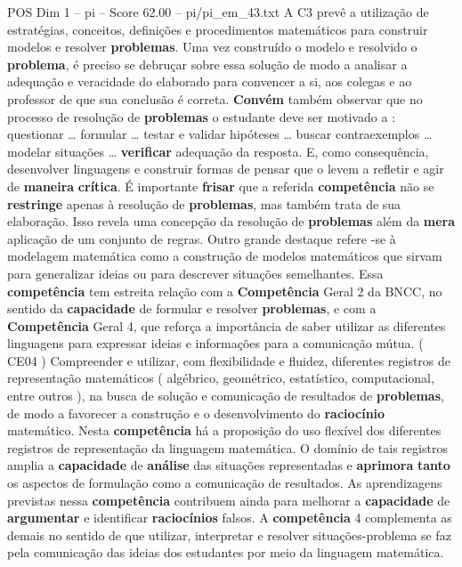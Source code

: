 \begin{textsample}{POS Dim 1 – pi – Score 62.00 – pi/pi\_em\_43.txt}
A C3 prevê a utilização de estratégias, conceitos, definições e procedimentos matemáticos para construir modelos e resolver \textbf{problemas}.
Uma vez construído o modelo e resolvido o \textbf{problema}, é preciso se debruçar sobre essa solução de modo a analisar a adequação e veracidade do elaborado para convencer a si, aos colegas e ao professor de que sua conclusão é correta. \textbf{Convém} também observar que no processo de resolução de \textbf{problemas} o estudante deve ser motivado a : questionar … formular … testar e validar hipóteses … buscar contraexemplos … modelar situações … \textbf{verificar} adequação da resposta.
E, como consequência, desenvolver linguagens e construir formas de pensar que o levem a refletir e agir de \textbf{maneira} \textbf{crítica}.
É importante \textbf{frisar} que a referida \textbf{competência} não se \textbf{restringe} apenas à resolução de \textbf{problemas}, mas também trata de sua elaboração.
Isso revela uma concepção da resolução de \textbf{problemas} além da \textbf{mera} aplicação de um conjunto de regras.
Outro grande destaque refere -se à modelagem matemática como a construção de modelos matemáticos que sirvam para generalizar ideias ou para descrever situações semelhantes.
Essa \textbf{competência} tem estreita relação com a \textbf{Competência} Geral 2 da BNCC, no sentido da \textbf{capacidade} de formular e resolver \textbf{problemas}, e com a \textbf{Competência} Geral 4, que reforça a importância de saber utilizar as diferentes linguagens para expressar ideias e informações para a comunicação mútua. ( CE04 ) Compreender e utilizar, com flexibilidade e fluidez, diferentes registros de representação matemáticos ( algébrico, geométrico, estatístico, computacional, entre outros ), na busca de solução e comunicação de resultados de \textbf{problemas}, de modo a favorecer a construção e o desenvolvimento do \textbf{raciocínio} matemático.
Nesta \textbf{competência} há a proposição do uso flexível dos diferentes registros de representação da linguagem matemática.
O domínio de tais registros amplia a \textbf{capacidade} de \textbf{análise} das situações representadas e \textbf{aprimora} \textbf{tanto} os aspectos de formulação como a comunicação de resultados.
As aprendizagens previstas nessa \textbf{competência} contribuem ainda para melhorar a \textbf{capacidade} de \textbf{argumentar} e identificar \textbf{raciocínios} falsos.
A \textbf{competência} 4 complementa as demais no sentido de que utilizar, interpretar e resolver situações-problema se faz pela comunicação das ideias dos estudantes por meio da linguagem matemática.

\end{textsample}
